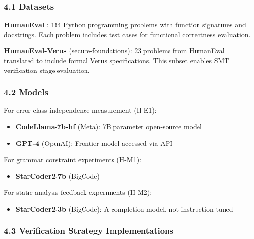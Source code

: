 
\subsubsection{4.1 Datasets}

\textbf{HumanEval} \citep{chen2021evaluating}: 164 Python programming problems with function signatures and docstrings. Each problem includes test cases for functional correctness evaluation.

\textbf{HumanEval-Verus} (secure-foundations): 23 problems from HumanEval translated to include formal Verus specifications. This subset enables SMT verification stage evaluation.

\begin{table}[htbp]
\centering
{}
\end{table}

\subsubsection{4.2 Models}

For error class independence measurement (H-E1):
\begin{itemize}
\item \textbf{CodeLlama-7b-hf} (Meta): 7B parameter open-source model
\item \textbf{GPT-4} (OpenAI): Frontier model accessed via API
\end{itemize}

For grammar constraint experiments (H-M1):
\begin{itemize}
\item \textbf{StarCoder2-7b} (BigCode)
\end{itemize}

For static analysis feedback experiments (H-M2):
\begin{itemize}
\item \textbf{StarCoder2-3b} (BigCode): A completion model, not instruction-tuned
\end{itemize}

\subsubsection{4.3 Verification Strategy Implementations}

